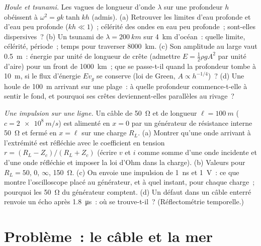 \begin{exercise}[$\star\star\star$]\label{exo:b2:dispersion-wave-packets:11}
\emph{Houle et tsunami.} Les vagues de longueur d'onde $\lambda$ sur une profondeur $h$
obéissent à $\omega^2 = gk\tanh kh$ (admis). (a) Retrouver les limites d'eau profonde et
d'eau peu profonde ($kh \ll 1$)~; célérité des ondes en eau peu profonde~; sont-elles
dispersives~? (b) Un tsunami de $\lambda = \qty{200}{km}$ sur \qty{4}{km} d'océan~:
quelle limite, célérité, période~; temps pour traverser \qty{8000}{km}. (c) Son
amplitude au large vaut \qty{0.5}{m}~: énergie par unité de longueur de crête
(admettre $E = \tfrac12\rho gA^2$ par unité d'aire) pour un front de \qty{1000}{km}~; que
se passe-t-il quand la profondeur tombe à \qty{10}{m}, si le flux d'énergie $Ev_g$ se
conserve (loi de Green, $A \propto h^{-1/4}$)~? (d) Une houle de \qty{100}{m}
arrivant sur une plage~: à quelle profondeur commence-t-elle à sentir le fond,
et pourquoi ses crêtes deviennent-elles parallèles au rivage~?
\end{exercise}

\begin{exercise}[$\star\star\star$]\label{exo:b2:dispersion-wave-packets:12}
\emph{Une impulsion sur une ligne.} Un câble de \qty{50}{\ohm} et de longueur $\ell = \qty{100}{m}$
($c = \qty{2e8}{m/s}$) est alimenté en $x = 0$ par un générateur de résistance
interne \qty{50}{\ohm} et fermé en $x = \ell$ sur une charge $R_L$. (a) Montrer
qu'une onde arrivant à l'extrémité est réfléchie avec le coefficient
en tension $r = (R_L - Z_c)/(R_L + Z_c)$ (écrire $v$ et $i$ comme somme d'une onde incidente
et d'une onde réfléchie et imposer la loi d'Ohm dans la charge). (b) Valeurs pour
$R_L = 50$, $0$, $\infty$, \qty{150}{\ohm}. (c) On envoie une impulsion de \qty{1}{ns} et \qty{1}{V}~:
ce que montre l'oscilloscope placé au générateur, et à quel instant, pour chaque
charge~; pourquoi les \qty{50}{\ohm} du générateur comptent. (d) Un défaut dans un câble
enterré renvoie un écho après \qty{1.8}{\micro s}~: où se trouve-t-il~? (Réflectométrie
temporelle.)
\end{exercise}

\section{Problème~: le câble et la mer}

